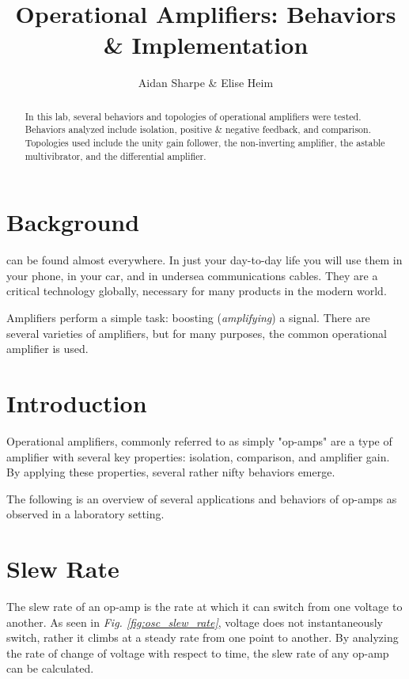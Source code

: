 \documentclass[journal]{IEEEtran}
\title{Operational Amplifiers: Behaviors \& Implementation}
\author{Aidan Sharpe \& Elise Heim}
\begin{document}
\maketitle

\begin{abstract}
    In this lab, several behaviors and topologies of operational amplifiers were tested. Behaviors analyzed include isolation, positive \& negative feedback, and comparison. Topologies used include the unity gain follower, the non-inverting amplifier, the astable multivibrator, and the differential amplifier. 
\end{abstract}

\section{Background} 
 can be found almost everywhere. In just your day-to-day life you will use them in your phone, in your car, and in undersea communications cables. They are a critical technology globally, necessary for many products in the modern world.

Amplifiers perform a simple task: boosting (\textit{amplifying}) a signal. There are several varieties of amplifiers, but for many purposes, the common operational amplifier is used.

\section{Introduction}
Operational amplifiers, commonly referred to as simply "op-amps" are a type of amplifier with several key properties: isolation, comparison, and amplifier gain. By applying these properties, several rather nifty behaviors emerge.

The following is an overview of several applications and behaviors of op-amps as observed in a laboratory setting.

\section{Slew Rate}
The slew rate of an op-amp is the rate at which it can switch from one voltage to another. As seen in \textit{Fig. \ref{fig:osc_slew_rate}}, voltage does not instantaneously switch, rather it climbs at a steady rate from one point to another. By analyzing the rate of change of voltage with respect to time, the slew rate of any op-amp can be calculated.
\end{document}
